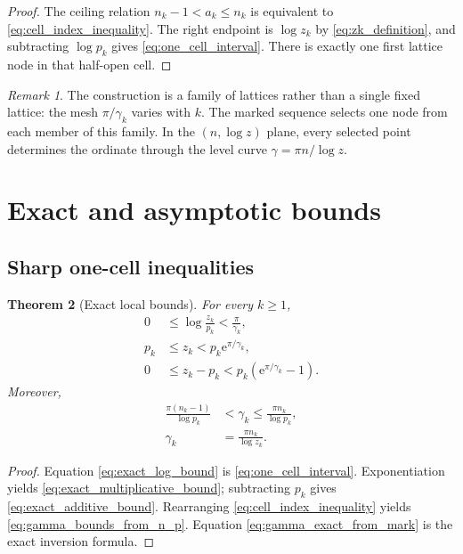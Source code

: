 \documentclass[11pt]{amsart}
\numberwithin{equation}{section}
\theoremstyle{plain}
\newtheorem{theorem}{Theorem}[section]
\theoremstyle{definition}
\theoremstyle{remark}
\newtheorem{remark}[theorem]{Remark}
\newcommand{\e}{\mathrm e}
\begin{document}
\begin{proof}
The ceiling relation
$n_k-1<a_k\leq n_k$ is equivalent to
\eqref{eq:cell_index_inequality}.  The right endpoint is $\log z_k$ by
\eqref{eq:zk_definition}, and subtracting $\log p_k$ gives
\eqref{eq:one_cell_interval}.  There is exactly one first lattice node in
that half-open cell.
\end{proof}

\begin{remark}
\label{rem:not_single_fixed_lattice}
The construction is a family of lattices rather than a single fixed lattice:
the mesh $\pi/\gamma_k$ varies with $k$.  The marked sequence selects one
node from each member of this family.  In the $(n,\log z)$ plane, every
selected point determines the ordinate through the level curve
$\gamma=\pi n/\log z$.
\end{remark}

\section{Exact and asymptotic bounds}
\label{sec:bounds}

\subsection{Sharp one-cell inequalities}
\label{subsec:sharp_one_cell_inequalities}

\begin{theorem}[Exact local bounds]
\label{thm:exact_local_bounds}
For every $k\geq1$,
\begin{align}
 0
 &\leq\log\frac{z_k}{p_k}
 <\frac{\pi}{\gamma_k},
 \label{eq:exact_log_bound}
 \\
 p_k
 &\leq z_k
 <p_k\e^{\pi/\gamma_k},
 \label{eq:exact_multiplicative_bound}
 \\
 0
 &\leq z_k-p_k
 <p_k\left(\e^{\pi/\gamma_k}-1\right).
 \label{eq:exact_additive_bound}
\end{align}
Moreover,
\begin{align}
 \frac{\pi(n_k-1)}{\log p_k}
 &<\gamma_k
 \leq\frac{\pi n_k}{\log p_k},
 \label{eq:gamma_bounds_from_n_p}
 \\
 \gamma_k
 &=\frac{\pi n_k}{\log z_k}.
 \label{eq:gamma_exact_from_mark}
\end{align}
\end{theorem}

\begin{proof}
Equation \eqref{eq:exact_log_bound} is
\eqref{eq:one_cell_interval}.  Exponentiation yields
\eqref{eq:exact_multiplicative_bound}; subtracting $p_k$ gives
\eqref{eq:exact_additive_bound}.  Rearranging
\eqref{eq:cell_index_inequality} yields
\eqref{eq:gamma_bounds_from_n_p}.  Equation
\eqref{eq:gamma_exact_from_mark} is the exact inversion formula.
\end{proof}
\end{document}
